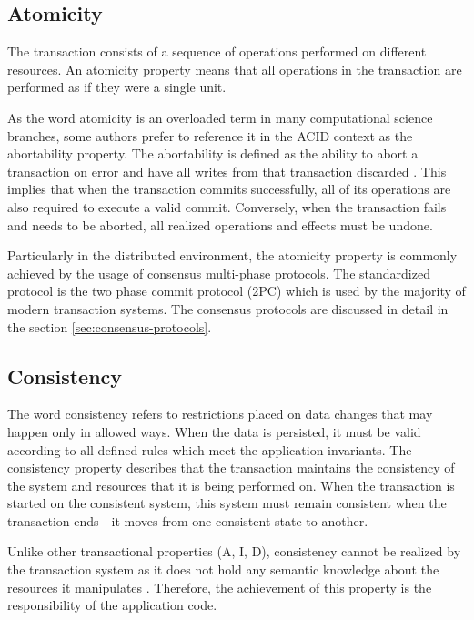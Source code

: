 \documentclass[oneside,
  digital, %
  table,   %
  nolof,     %
  nolot,     %
]{fithesis3}
\begin{document}
\subsection{Atomicity}

The transaction consists of a sequence of operations performed on different resources. An atomicity property means that all operations in the transaction are performed as if they were a single unit. 

As the word atomicity is an overloaded term in many computational science branches, some authors prefer to reference it in the ACID context as the abortability property. The abortability is defined as  the ability to abort a transaction on error and have all writes from that transaction discarded \cite{design_data_intens_apps}. This implies that when the transaction commits successfully, all of its operations are also required to execute a valid commit. Conversely, when the transaction fails and needs to be aborted, all realized operations and effects must be undone.

Particularly in the distributed environment, the atomicity property is commonly achieved by the usage of consensus multi-phase protocols. The standardized protocol is the two phase commit protocol (2PC) which is used by the majority of modern transaction systems. The consensus protocols are discussed in detail in the section \ref{sec:consensus-protocols}.

\subsection{Consistency}

The word consistency refers to restrictions placed on data changes that may happen only in allowed ways. When the data is persisted, it must be valid according to all defined rules which meet the application invariants. The consistency property describes that the transaction maintains the consistency of the system and resources that it is being performed on. When the transaction is started on the consistent system, this system must remain consistent when the transaction ends - it moves from one consistent state to another.

Unlike other transactional properties (A, I, D), consistency cannot be realized by the transaction system as it does not hold any semantic knowledge about the resources it manipulates \cite{java_tran_processing}. Therefore, the achievement of this property is the responsibility of the application code.
\end{document}
